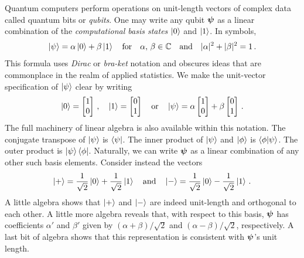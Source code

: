 \documentclass[12pt]{article} %
\begin{document}
Quantum computers perform operations on unit-length vectors of complex data called quantum bits or \emph{qubits}.  One may write any qubit $\boldsymbol{\psi}$ as a linear combination of the \emph{computational basis states} $\ket{0}$ and $\ket{1}$.  In symbols,
\begin{align*}
\ket{\psi} = \alpha \ket{0} + \beta \ket{1} \quad \mbox{for} \quad \alpha, \, \beta \in \mathbb{C} \quad \mbox{and} \quad  |\alpha|^2 + |\beta|^2 = 1\, .
\end{align*}
This formula uses \emph{Dirac} or \emph{bra-ket} notation and obscures ideas that are commonplace in the realm of applied statistics. We make the unit-vector specification of $\ket{\psi}$ clear by writing
\begin{align*}
\ket{0}=\begin{bmatrix}
1 \\ 0
\end{bmatrix} \, ,  \quad \ket{1}=\begin{bmatrix}
0 \\ 1
\end{bmatrix} \quad \mbox{or} \quad \ket{\psi} = \alpha \begin{bmatrix}
1 \\ 0
\end{bmatrix} + \beta  \begin{bmatrix}
0 \\ 1
\end{bmatrix}\, .
\end{align*} 
The full machinery of linear algebra is also available within this notation. The conjugate transpose of $\ket{\psi}$ is $\bra{\psi}$. The inner product of $\ket{\psi}$ and $\ket{\phi}$ is $\braket{\phi|\psi}$. The outer product is $\ket{\psi}\bra{\phi}$. Naturally, we can write $\boldsymbol{\psi}$ as a linear combination of any other such basis elements. Consider instead the vectors
\begin{align*}
\ket{+} = \frac{1}{\sqrt{2}} \ket{0} + \frac{1}{\sqrt{2}} \ket{1} \quad \mbox{and} \quad \ket{-} = \frac{1}{\sqrt{2}} \ket{0} - \frac{1}{\sqrt{2}} \ket{1} \, .
\end{align*}
A little algebra shows that $\ket{+}$ and $\ket{-}$ are indeed unit-length and orthogonal to each other. A little more algebra reveals that, with respect to this basis, $\boldsymbol{\psi}$ has coefficients $\alpha'$ and $\beta'$ given by $(\alpha + \beta)/\sqrt{2}$ and $(\alpha - \beta)/\sqrt{2}$, respectively. A last bit of algebra shows that this representation is consistent with $\boldsymbol{\psi}$'s unit length.
\end{document}
